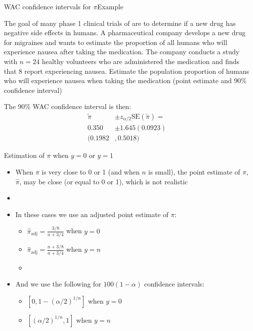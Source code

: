 \documentclass[xcolor=dvipsnames]{beamer}
\begin{document}
\begin{frame}{WAC confidence intervals for $\pi$}{Example}
	\begin{itemize} {\tiny
			\item The goal of many phase 1 clinical trials of are to determine if a new drug has negative side effects in humans. A pharmaceutical company develops a new drug for migraines and wants to estimate the proportion of all humans who will experience nausea after taking the medication. The company conducts a study with $n = 24$ healthy volunteers who are administered the medication and finds that 8 report experiencing nausea. Estimate the population proportion of humans who will experience nausea when taking the medication (point estimate and 90\% confidence interval) } 
		\item[]
		\item The 90\% WAC confidence interval is then:  \pause
		\begin{align*}
			\tilde{\pi} &\pm z_{\alpha/2} \text{SE}(\tilde{\pi}) =\\
			  0.350 &\pm 1.645(0.0923) \\
			  (0.1982&, 0.5018)
		\end{align*}
	\end{itemize}
\end{frame}

\begin{frame}{Estimation of $\pi$ when $y = 0$ or $y = 1$}
	\begin{itemize}
		\item When $\pi$ is very close to 0 or 1 (and when $n$ is small), the point estimate of $\pi$, $\hat{\pi}$, may be close (or equal to 0 or 1), which is not realistic  \pause
		\item[]
		\item In these cases we use an adjusted point estimate of $\pi$:  \pause
		\begin{itemize}
			\item $\hat{\pi}_{\text{adj}}= \frac{3/8}{n + 3/4}$ when $y = 0$  \pause
			\item $\hat{\pi}_{\text{adj}}= \frac{n + 3/8}{n + 3/4}$ when $y = n$
			\item[]
		\end{itemize}
		
		\item And we use the following for $100(1-\alpha)$ confidence intervals:  \pause
		\begin{itemize}
			\item $\left[0, 1 - (\alpha / 2)^{1/n}\right]$ when $y = 0$  \pause
			\item $\left[(\alpha / 2)^{1/n}, 1\right]$ when $y = n$
		\end{itemize}
	\end{itemize}
\end{frame}
\end{document}
